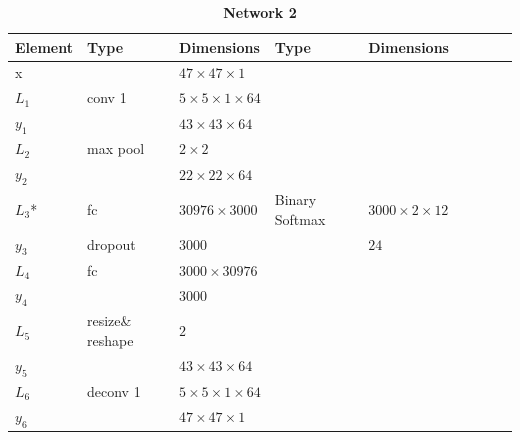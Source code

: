     \begin{table}[h!] \caption*{\textbf{Network 2}}
    \centering
    {\footnotesize
    \begin{tabular}{|lllllllll|}
    \hline
    \multicolumn{1}{|l|}{Element} & Type     & \multicolumn{1}{l|}{Dimensions}                     & Type     & \multicolumn{1}{l|}{Dimensions}  \\ \hline
    \multicolumn{1}{|l|}{x}       &          & \multicolumn{1}{l|}{$47\times47\times1$}            &          & \multicolumn{1}{l|}{}            \\ \hline
    \multicolumn{1}{|l|}{$L_1$}   & conv 1   & \multicolumn{1}{l|}{$5\times 5\times1\times 64$}    &          & \multicolumn{1}{l|}{}            \\
    \multicolumn{1}{|l|}{$y_1$}   &          & \multicolumn{1}{l|}{$43\times43\times64$}           &          & \multicolumn{1}{l|}{}            \\ \hline
    \multicolumn{1}{|l|}{$L_2$}   & max pool & \multicolumn{1}{l|}{$2\times 2$}                    &          & \multicolumn{1}{l|}{}            \\
    \multicolumn{1}{|l|}{$y_2$}   &          & \multicolumn{1}{l|}{$22\times22\times 64$}          &          & \multicolumn{1}{l|}{}            \\ \hline
    \multicolumn{1}{|l|}{$L_3$*}   & fc       & \multicolumn{1}{l|}{$30976\times3000$}              & Binary
                                                                                                      Softmax & \multicolumn{1}{l|}{$3000\times2\times12$}        \\
    \multicolumn{1}{|l|}{$y_3$}   & dropout  & \multicolumn{1}{l|}{$3000$}                         &          & \multicolumn{1}{l|}{$24$}        \\ \hline
    \multicolumn{1}{|l|}{$L_4$}   & fc       & \multicolumn{1}{l|}{$3000\times30976$}              &          & \multicolumn{1}{l|}{}            \\
    \multicolumn{1}{|l|}{$y_4$}   &          & \multicolumn{1}{l|}{$3000$}                         &          & \multicolumn{1}{l|}{}            \\ \hline
    \multicolumn{1}{|l|}{$L_5$}   & resize\& reshape & \multicolumn{1}{l|}{$2$}                    &          & \multicolumn{1}{l|}{}            \\
    \multicolumn{1}{|l|}{$y_5$}   &            & \multicolumn{1}{l|}{$43\times43\times 64$}          &          & \multicolumn{1}{l|}{}            \\ \hline
    \multicolumn{1}{|l|}{$L_6$}   & deconv 1   & \multicolumn{1}{l|}{$5\times 5\times1\times 64$}  &          & \multicolumn{1}{l|}{}            \\
    \multicolumn{1}{|l|}{$y_6$}   &            & \multicolumn{1}{l|}{$47\times47\times1$}            &          & \multicolumn{1}{l|}{}             \\ \hline
    \end{tabular}

}
\end{table}
